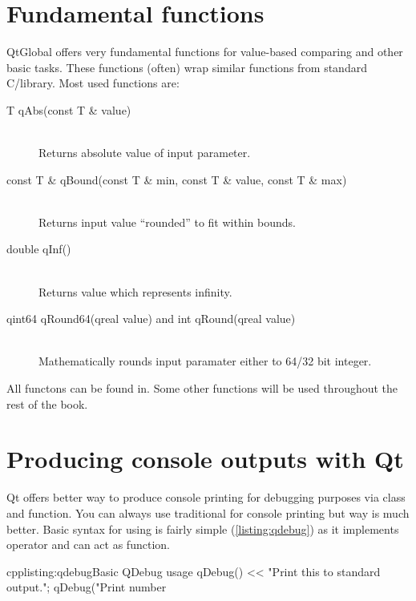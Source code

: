 \section{Fundamental functions}
QtGlobal offers very fundamental functions for value-based comparing and other basic tasks. These functions (often) wrap similar functions from standard C/\cpp library. Most used functions are:
\begin{description}
\item[T qAbs(const T \& value)] \hfill \\
Returns absolute value of input parameter.
\item[const T \& qBound(const T \& min, const T \& value, const T \& max)] \hfill \\
Returns input value \enquote{rounded} to fit within bounds.
\item[double qInf()] \hfill \\
Returns value which represents infinity.
\item[qint64 qRound64(qreal value) and int qRound(qreal value)] \hfill \\
Mathematically rounds input paramater either to 64/32 bit integer.
\end{description}

All functons can be found in. Some other functions will be used throughout the rest of the book.

\section{Producing console outputs with Qt}
Qt offers better way to produce console printing for debugging purposes via  class and function. You can always use traditional for console printing but way is much better. Basic syntax for using is fairly simple (\autoref{listing:qdebug}) as it implements  operator and can act as  function.

\begin{fdoccode}{cpp}{listing:qdebug}{Basic QDebug usage}
qDebug() << "Print this to standard output.";
qDebug("Print number %
\end{fdoccode}

